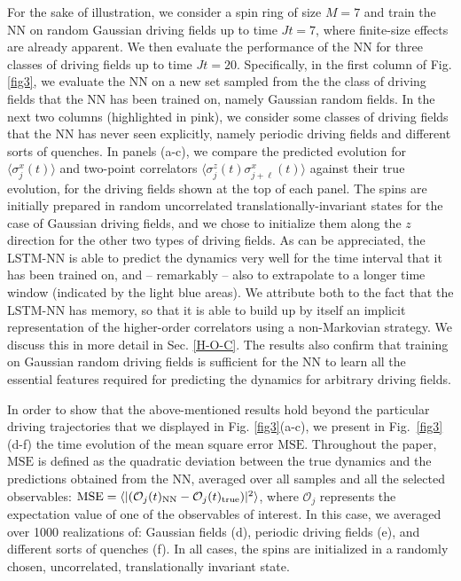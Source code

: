 \documentclass[a4paper,aps,amsmath,amssymb,twocolumn,longbibliography,,accepted=2022-05-17]{quantumarticle}
\begin{document}
For the sake of illustration, we consider a spin ring of size $M=7$ and train the NN on random Gaussian driving fields up to time $Jt=7$, where finite-size effects are already apparent. We then evaluate the performance of the NN for three classes of driving fields up to time $Jt=20$. Specifically, in the first column of Fig. \ref{fig3}, we evaluate the NN on a new set sampled from the the class of driving fields that the NN has been trained on, namely Gaussian random fields. In the next two columns (highlighted in pink), we consider some classes of driving fields that the NN has never seen explicitly, namely periodic driving fields and different sorts of quenches. In panels (a-c), we compare the predicted evolution for $\langle \sigma_j^{x}(t) \rangle$ and two-point correlators $\langle \sigma_j^{z}(t)\sigma_{j+\ell}^{x}(t) \rangle$ against their true evolution, for the driving fields shown at the top of each panel. The spins are initially prepared in random uncorrelated translationally-invariant states for the case of Gaussian driving fields, and we chose to initialize them along the $z$ direction for the other two types of driving fields. As can be appreciated, the LSTM-NN is able to predict the dynamics very well for the time interval that it has been trained on, and -- remarkably -- also to extrapolate to a longer time window (indicated by the light blue areas). We attribute both to the fact that the LSTM-NN has memory, so that it is able to build up by itself an implicit representation of the higher-order correlators using a non-Markovian strategy. We discuss this in more detail in Sec. \ref{H-O-C}. The results also confirm that training on Gaussian random driving fields is sufficient for the NN to learn all the essential features required for predicting the dynamics for arbitrary driving fields.

In order to show that the above-mentioned results hold beyond the particular driving trajectories that we displayed in Fig. \ref{fig3}(a-c), we present in Fig.~\ref{fig3}(d-f) the time evolution of the mean square error ${\textrm{MSE}}$. Throughout the paper, ${\textrm{MSE}}$ is defined as the quadratic deviation between the true dynamics and the predictions obtained from the NN, averaged over all samples and all the selected observables: ${\textrm{MSE}}=\langle|(\mathcal{O}_{j}(t)_{\rm NN}-\mathcal{O}_{j}(t)_{\rm true})|^2\rangle$, where $\mathcal{O}_j$ represents the expectation value of one of the observables of interest. In this case, we averaged over 1000 realizations of: Gaussian fields (d), periodic driving fields (e), and different sorts of quenches (f). In all cases, the spins are initialized in a randomly chosen, uncorrelated, translationally invariant state.
\end{document}
